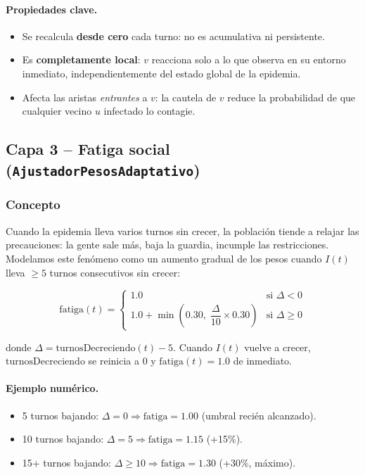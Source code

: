 \documentclass[spanish,notitlepage,letterpaper, 12pt]{article}
\begin{document}
\paragraph{Propiedades clave.}
\begin{itemize}[leftmargin=*]
    \item Se recalcula \textbf{desde cero} cada turno: no es acumulativa ni persistente.
    \item Es \textbf{completamente local}: $v$ reacciona solo a lo que observa en su entorno inmediato, independientemente del estado global de la epidemia.
    \item Afecta las aristas \emph{entrantes} a $v$: la cautela de $v$ reduce la probabilidad de que cualquier vecino $u$ infectado lo contagie.
\end{itemize}

\subsection{Capa 3 -- Fatiga social (\texttt{AjustadorPesosAdaptativo})}
\label{sec:fatiga}

\subsubsection{Concepto}

Cuando la epidemia lleva varios turnos sin crecer, la poblaci\'on tiende a relajar las precauciones: la gente sale m\'as, baja la guardia, incumple las restricciones. Modelamos este fen\'omeno como un aumento gradual de los pesos cuando $I(t)$ lleva $\geq 5$ turnos consecutivos sin crecer:

\begin{equation}
\mathrm{fatiga}(t) = \begin{cases}
1.0 & \text{si } \Delta < 0 \\[6pt]
1.0 + \min\!\left(0.30,\;\dfrac{\Delta}{10} \times 0.30\right) & \text{si } \Delta \geq 0
\end{cases}
\label{eq:fatiga}
\end{equation}

donde $\Delta = \mathrm{turnosDecreciendo}(t) - 5$. Cuando $I(t)$ vuelve a crecer, $\mathrm{turnosDecreciendo}$ se reinicia a 0 y $\mathrm{fatiga}(t) = 1.0$ de inmediato.

\paragraph{Ejemplo num\'erico.}
\begin{itemize}
    \item 5 turnos bajando: $\Delta = 0 \Rightarrow \mathrm{fatiga} = 1.00$ (umbral reci\'en alcanzado).
    \item 10 turnos bajando: $\Delta = 5 \Rightarrow \mathrm{fatiga} = 1.15$ (+15\%).
    \item 15+ turnos bajando: $\Delta \geq 10 \Rightarrow \mathrm{fatiga} = 1.30$ (+30\%, m\'aximo).
\end{itemize}
\end{document}
